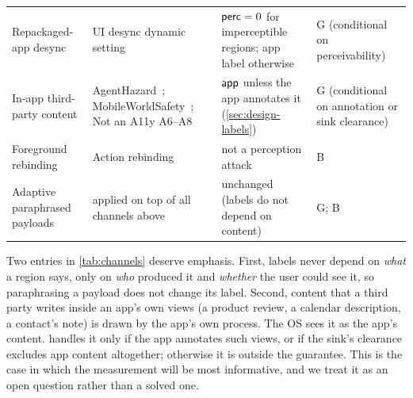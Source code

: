 \begin{table}[t]
\begin{tabularx}{\textwidth}{@{}>{\raggedright\arraybackslash}p{3.2cm} >{\raggedright\arraybackslash}X >{\raggedright\arraybackslash}p{2.6cm} >{\raggedright\arraybackslash}p{2.6cm}@{}}
Repackaged-app desync & UI desync dynamic setting~\cite{li2026uidesync} & $\mathsf{perc}=0$ for imperceptible regions; app label otherwise & G (conditional on perceivability) \\
In-app third-party content & AgentHazard~\cite{liu2026agenthazard}; MobileWorldSafety~\cite{chen2026mobileworldsafety}; Not an A11y A6--A8~\cite{deivasigamani2026nota11y} & $\textsf{app}$ unless the app annotates it (\cref{sec:design-labels}) & G (conditional on annotation or sink clearance) \\
Foreground rebinding & Action rebinding~\cite{qian2026zeropermission} & not a perception attack & B \\
Adaptive paraphrased payloads & applied on top of all channels above & unchanged (labels do not depend on content) & G; B \\
\bottomrule
\end{tabularx}
\end{table}

Two entries in \cref{tab:channels} deserve emphasis. First, labels never depend on \emph{what} a region says, only on \emph{who} produced it and \emph{whether} the user could see it, so paraphrasing a payload does not change its label. Second, content that a third party writes inside an app's own views (a product review, a calendar description, a contact's note) is drawn by the app's own process. The OS sees it as the app's content. \PG{} handles it only if the app annotates such views, or if the sink's clearance excludes app content altogether; otherwise it is outside the guarantee. This is the case in which the measurement will be most informative, and we treat it as an open question rather than a solved one.

